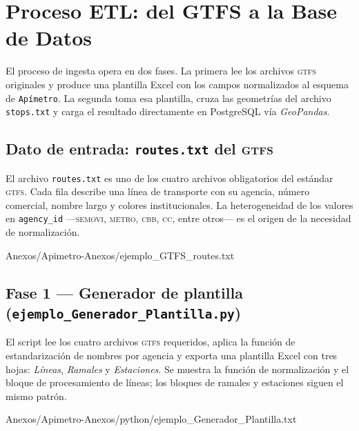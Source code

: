 
\section{Proceso ETL: del GTFS a la Base de Datos}
\label{anx:apimetro-etl}

El proceso de ingesta opera en dos fases. La primera lee los archivos
\textsc{gtfs} originales y produce una plantilla Excel con los campos
normalizados al esquema de \texttt{Apímetro}. La segunda toma esa plantilla,
cruza las geometrías del archivo \texttt{stops.txt} y carga el resultado
directamente en PostgreSQL vía \textit{GeoPandas}.

\subsection*{Dato de entrada: \texttt{routes.txt} del \textsc{gtfs}}

El archivo \texttt{routes.txt} es uno de los cuatro archivos obligatorios del
estándar \textsc{gtfs}. Cada fila describe una línea de transporte con su
agencia, número comercial, nombre largo y colores institucionales. La
heterogeneidad de los valores en \texttt{agency\_id} —\textsc{semovi},
\textsc{metro}, \textsc{cbb}, \textsc{cc}, entre otros— es el origen de la
necesidad de normalización.

 {Anexos/Apimetro-Anexos/ejemplo_GTFS_routes.txt}

\subsection*{Fase 1 — Generador de plantilla
(\texttt{ejemplo\_Generador\_Plantilla.py})}

El script lee los cuatro archivos \textsc{gtfs} requeridos, aplica la función de
estandarización de nombres por agencia y exporta una plantilla Excel con tres
hojas: \textit{Líneas}, \textit{Ramales} y \textit{Estaciones}. Se muestra la
función de normalización y el bloque de procesamiento de líneas; los bloques de
ramales y estaciones siguen el mismo patrón.

 {Anexos/Apimetro-Anexos/python/ejemplo_Generador_Plantilla.txt}

